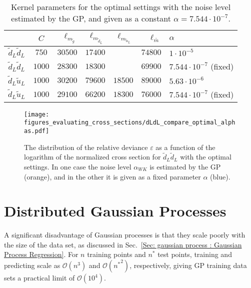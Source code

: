 \documentclass[twoside,english]{uiofysmaster}
\begin{document}
\begin{table}
\centering
\begin{tabular}{@{}ccrrrrl@{}} \toprule
& $C$ & $\ell_{m_{\tilde{g}}}$ & $\ell_{m_{\tilde{d}_L}}$ &$\ell_{m_{\tilde{u}_L}}$ & $\ell_{\bar{m}}$ & $\alpha$\\
\midrule
$\tilde{d}_L \tilde{d}_L$ & $750$ & $30500$ & $17400$ && $74800$ & $1 \cdot 10^{-5}$\\
$\tilde{d}_L \tilde{d}_L$ & $1000$ & $28300$ & $18300$ && $69900$ & $7.544 \cdot 10^{-7}$ (fixed)\\
$\tilde{d}_L \tilde{u}_L$ & $1000$ & $30200$ & $79600$ & $18500$ & $89000$ & $5.63 \cdot 10^{-6}$\\
$\tilde{d}_L \tilde{u}_L$ & $1000$ & $29100$ & $66200$ & $18300$ & $76000$ & $7.544 \cdot 10^{-7}$ (fixed)\\ \bottomrule
\end{tabular}
\caption{Kernel parameters for the optimal settings with the noise level estimated by the GP, and given as a constant $\alpha=7.544 \cdot 10^{-7}$.}
\label{Tab:: evaluating cross : optimal kernel parameters alpha}
\end{table}

\begin{figure}
\centering
\texttt{[image: figures\_evaluating\_cross\_sections/dLdL\_compare\_optimal\_alphas.pdf]}
\caption{The distribution of the relative deviance $\varepsilon$ as a function of the logarithm of the normalized cross section for $\tilde{d}_L \tilde{d}_L$ with the optimal settings. In one case the noise level $\alpha_{WK}$ is estimated by the GP (orange), and in the other it is given as a fixed parameter $\alpha$ (blue).}
\label{Fig:: evaluating cross : errors distribution alpha vs no alpha optimal}
\end{figure}




\section{Distributed Gaussian Processes}\label{Sec:: gaussian process : Distributed Gaussian Processes}



A significant disadvantage of Gaussian processes is that they scale poorly with the size of the data set, as discussed in Sec.~\ref{Sec: gaussian process : Gaussian Process Regression}. For $n$ training points and $n^*$ test points, training and predicting scale as $\mathcal{O}(n^3)$ and $\mathcal{O}({n^*}^2)$, respectively, giving GP training data sets a practical limit of $\mathcal{O}(10^4)$.
\end{document}
